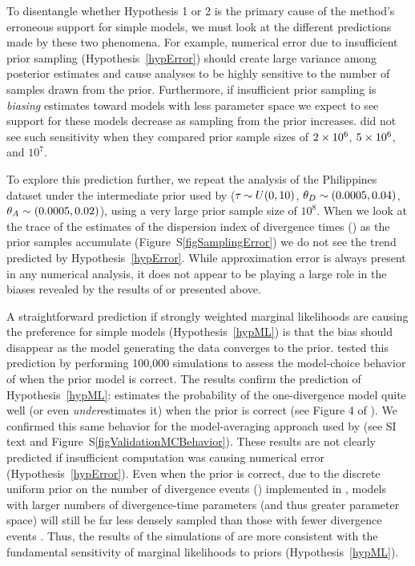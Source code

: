 To disentangle whether Hypothesis 1 or 2 is the primary cause of the method's
erroneous support for simple models, we must look at the different predictions
made by these two phenomena.
For example, numerical error due to insufficient prior sampling
(Hypothesis~\ref{hypError}) should create large variance among posterior
estimates and cause analyses to be highly sensitive to the number of samples
drawn from the prior.
Furthermore, if insufficient prior sampling is \emph{biasing} estimates toward
models with less parameter space we expect to see support for these models
decrease as sampling from the prior increases.
\citet{Oaks2012} did not see such sensitivity when they compared prior sample
sizes of $2\times 10^{6}$, $5\times 10^{6}$, and $10^7$.

To explore this prediction further, we repeat the analysis of the Philippines
dataset under the intermediate prior used by \citet{Oaks2012} ($\tau_{} \sim
U(0, 10)$, $\meanDescendantTheta{} \sim (0.0005, 0.04)$, $\ancestralTheta{}
\sim (0.0005, 0.02)$), using a very large prior sample size of $10^8$.
When we look at the trace of the estimates of the dispersion index of
divergence times (\vmratio{}) as the prior samples accumulate
(Figure~S\ref{figSamplingError}) we do not see the trend predicted by
Hypothesis~\ref{hypError}.
While approximation error is always present in any numerical analysis, it does
not appear to be playing a large role in the biases revealed by the results of
\citet{Oaks2012} or presented above.

A straightforward prediction if strongly weighted marginal likelihoods are
causing the preference for simple models (Hypothesis~\ref{hypML}) is that the
bias should disappear as the model generating the data converges to the prior.
\citet{Oaks2012} tested this prediction by performing 100,000 simulations to
assess the model-choice behavior of \msb when the prior model is correct.
The results confirm the prediction of Hypothesis~\ref{hypML}:
\msb estimates the probability of the one-divergence model quite well (or even
\emph{under}estimates it) when the prior is correct (see Figure 4 of
\citet{Oaks2012}).
We confirmed this same behavior for the model-averaging approach used by
\citet{Hickerson2013} (see SI text and Figure~S\ref{figValidationMCBehavior}).
These results are not clearly predicted if insufficient computation was causing
numerical error (Hypothesis~\ref{hypError}).
Even when the prior is correct, due to the discrete uniform prior on the number
of divergence events (\numt{}) implemented in \msb, models with larger numbers
of divergence-time parameters (and thus greater parameter space) will still be
far less densely sampled than those with fewer divergence events
\citep{Oaks2012}.
Thus, the results of the simulations of \citet{Oaks2012} are more consistent
with the fundamental sensitivity of marginal likelihoods to priors
(Hypothesis~\ref{hypML}).

